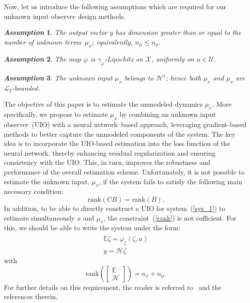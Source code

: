 \documentclass{ifacconf}
\def\eqref#1{(\ref{#1})}
\newtheorem{assumption}{\it \textbf{Assumption}}%
\begin{document}
Now, let us introduce the following assumptions which are required for our unknown input observer design methods.
\begin{assumption}\label{ali_hyp1}
The output vector $y$ has dimension greater than or equal to the number of unknown terms~$\mu_{x}$; equivalently, $n_{\mu} \leq n_y$.
\end{assumption}

\begin{assumption}\label{ali_hyp2}
The map $\varphi$ is $\gamma_{\varphi}$-Lipschitz on $\mathcal{X}$, uniformly on $u\in\mathcal{U}$.
\end{assumption}

\begin{assumption}\label{ali_hyp3}
The unknown input $\mu_{x}$ belongs to $\mathcal{H}^{1}$; hence both $\mu_x$ and $\dot{\mu}_x$ are $\mathcal{L}_{2}$-bounded.
\end{assumption}

The objective of this paper is to estimate the unmodeled dynamics $\mu_{x}$. More specifically, we propose to estimate $\mu_{x}$ by combining an unknown input observer~(UIO) with a neural network--based approach, leveraging gradient-based methods to better capture the unmodeled components of the system. The key idea is to incorporate the UIO-based estimation into the loss function of the neural network, thereby enhancing residual regularization and ensuring consistency with the UIO. This, in turn, improves the robustness and performance of the overall estimation scheme. Unfortunately, it is not possible to estimate the unknown input, $\mu_x$, if the system fails to satisfy the following main necessary condition:
\begin{equation}\label{rank}
\textrm{rank}(C B) = \textrm{rank}(B).
\end{equation}
%
In addition, to be able to directly construct a UIO for system~\eqref{sys_1} to estimate simultaneously $x$ and $\mu_x$, the constraint~\eqref{rank} is not sufficient. For this, we should be able to write the system under the form:
\begin{equation}\label{sys_2}
    \begin{array}{l}
        \mathbb{E} \dot{\zeta} = \varphi_{\zeta}(\zeta,u)  \\
        y = \mathcal{H} \zeta
    \end{array}
\end{equation}
with
\begin{equation}\label{rank2}
\textrm{rank}\left( \begin{bmatrix} \mathbb{E} \\  \mathcal{H} \end{bmatrix} \right) = n_{x} + n_{\mu}.
\end{equation}
For further details on this requirement, the reader is referred to~\cite{Trinh:TAC08} and the references therein. 
\end{document}
